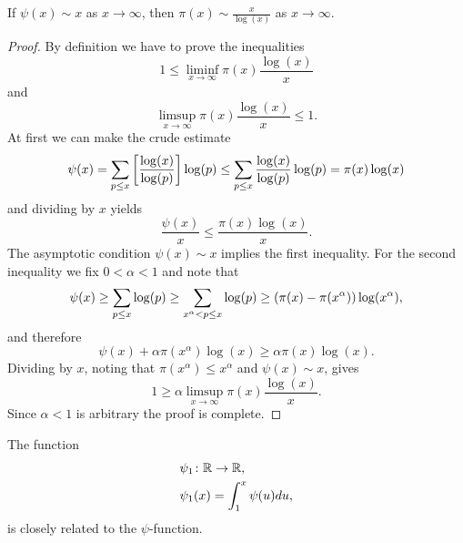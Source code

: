 \begin{lemma}
	If $\psi(x) \sim x$ as $x \to \infty$, then $\pi(x) \sim \frac{x}{\log(x)}$ as $x \to \infty$.
\end{lemma}
\begin{proof}
	By definition we have to prove the inequalities
\begin{equation*}
	1 \leq \liminf _{x \to \infty} \pi(x) \frac{\log(x)}{x}
\end{equation*}
	and
\begin{equation*}
	\limsup _{x \to \infty} \pi(x) \frac{\log(x)}{x} \leq 1.
\end{equation*}
	At first we can make the crude estimate
\begin{equation*}
	\psi(x) = \sum _{p \leq x} \left[\frac{\log(x)}{\log(p)}\right] \log(p) \leq \sum _{p \leq x} \frac{\log(x)}{\log(p)} \log(p) = \pi(x) \log(x)
\end{equation*}
	and dividing by $x$ yields
\begin{equation*}
	\frac{\psi(x)}{x} \leq \frac{\pi(x) \log(x)}{x}.
\end{equation*}
	The asymptotic condition $\psi(x) \sim x$ implies the first inequality. For the second inequality we fix $0 < \alpha < 1$ and note that
\begin{equation*}
	\psi(x) \geq \sum _{p \leq x} \log(p) \geq \sum _{x^\alpha < p \leq x} \log(p) \geq \left(\pi(x) - \pi(x^\alpha)\right) \log(x^\alpha),
\end{equation*}
	and therefore
\begin{equation*}
	\psi(x) + \alpha \pi(x^\alpha) \log(x) \geq \alpha \pi(x) \log(x).
\end{equation*}
	Dividing by $x$, noting that $\pi(x^\alpha) \leq x^\alpha$ and $\psi(x) \sim x$, gives
\begin{equation*}
	1 \geq \alpha \limsup _{x \to \infty} \pi(x) \frac{\log(x)}{x}.
\end{equation*}
	Since $\alpha < 1$ is arbitrary the proof is complete.
\end{proof}


\begin{definition}
	The function
\begin{equation*}
\begin{aligned}
	&\psi_1 \colon \mathbb{R} \to \mathbb{R}, \\
	&\psi_1(x) = \int _1 ^x \psi(u) du,
\end{aligned}
\end{equation*}
	is closely related to the $\psi$-function.
\end{definition}


